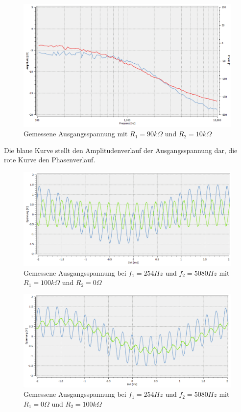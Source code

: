 \begin{figure}[htb]
    \includegraphics[width=16cm]{./pictures/Messungen/Gesamtschaltung_Test_90_10}
    \caption{Gemessene Ausgangsspannung mit $R_1 = 90k\Omega$ und $R_2 = 10k\Omega$}
    \label{fig:Gesamtschaltung_Test_90_10}
\end{figure}

Die blaue Kurve stellt den Amplitudenverlauf der Ausgangsspannung dar, die rote Kurve den Phasenverlauf.

\newpage

\begin{figure}[htb]
    \includegraphics[width=16cm]{./pictures/Messungen/Ueberlagerung_100_0}
    \caption{Gemessene Ausgangsspannung bei $f_{1} = 254Hz$ und $f_{2} = 5080Hz$ mit $R_1 = 100k\Omega$ und $R_2 = 0\Omega$}
    \label{fig:Überlagerung_100_0}
\end{figure}

\begin{figure}[htb]
    \includegraphics[width=16cm]{./pictures/Messungen/Ueberlagerung_0_100}
    \caption{Gemessene Ausgangsspannung bei $f_{1} = 254Hz$ und $f_{2} = 5080Hz$ mit $R_1 = 0\Omega$ und $R_2 = 100k\Omega$}
    \label{fig:Überlagerung_0_100}
\end{figure}

